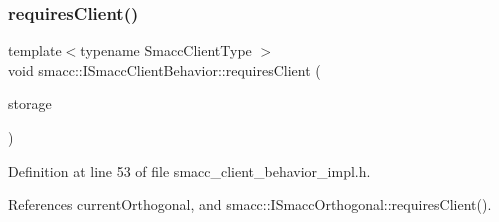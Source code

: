 \subsubsection{\texorpdfstring{requires\+Client()}{requiresClient()}}
{\footnotesize\ttfamily template$<$typename Smacc\+Client\+Type $>$ \\
void smacc\+::\+I\+Smacc\+Client\+Behavior\+::requires\+Client (\begin{DoxyParamCaption}\item[{Smacc\+Client\+Type $\ast$\&}]{storage }\end{DoxyParamCaption})}



Definition at line 53 of file smacc\+\_\+client\+\_\+behavior\+\_\+impl.\+h.



References current\+Orthogonal, and smacc\+::\+I\+Smacc\+Orthogonal\+::requires\+Client().



